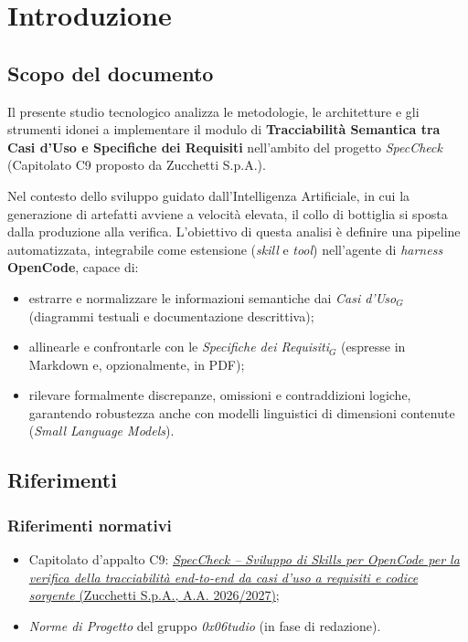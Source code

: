 \documentclass[a4paper, 11pt]{article}
\newcommand{\term}[1]{\textit{#1}$_G$} %
\begin{document}
\newpage
\tableofcontents
\newpage

\section{Introduzione}

\subsection{Scopo del documento}
Il presente studio tecnologico analizza le metodologie, le architetture e gli strumenti idonei a implementare il modulo di \textbf{Tracciabilità Semantica tra Casi d'Uso e Specifiche dei Requisiti} nell'ambito del progetto \textit{SpecCheck} (Capitolato C9 proposto da Zucchetti S.p.A.). 

Nel contesto dello sviluppo guidato dall'Intelligenza Artificiale, in cui la generazione di artefatti avviene a velocità elevata, il collo di bottiglia si sposta dalla produzione alla verifica. L'obiettivo di questa analisi è definire una pipeline automatizzata, integrabile come estensione (\textit{skill} e \textit{tool}) nell'agente di \textit{harness} \textbf{OpenCode}, capace di:
\begin{itemize}[noitemsep]
    \item estrarre e normalizzare le informazioni semantiche dai \term{Casi d'Uso} (diagrammi testuali e documentazione descrittiva);
    \item allinearle e confrontarle con le \term{Specifiche dei Requisiti} (espresse in Markdown e, opzionalmente, in PDF);
    \item rilevare formalmente discrepanze, omissioni e contraddizioni logiche, garantendo robustezza anche con modelli linguistici di dimensioni contenute (\textit{Small Language Models}).
\end{itemize}

\subsection{Riferimenti}
\subsubsection{Riferimenti normativi}
\begin{itemize}[noitemsep]
    \item Capitolato d'appalto C9: \href{https://www.math.unipd.it/~tullio/IS-1/2026/Progetto/C9-SpecCheck.pdf}{\textit{SpecCheck -- Sviluppo di Skills per OpenCode per la verifica della tracciabilità end-to-end da casi d'uso a requisiti e codice sorgente} (Zucchetti S.p.A., A.A. 2026/2027)};
    \item \textit{Norme di Progetto} del gruppo \textit{0x06tudio} (in fase di redazione).
\end{itemize}
\end{document}
